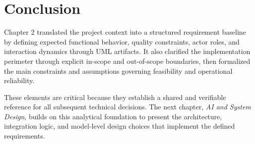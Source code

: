\section{Conclusion}
Chapter 2 translated the project context into a structured requirement baseline by defining expected functional behavior, quality constraints, actor roles, and interaction dynamics through UML artifacts. It also clarified the implementation perimeter through explicit in-scope and out-of-scope boundaries, then formalized the main constraints and assumptions governing feasibility and operational reliability.

These elements are critical because they establish a shared and verifiable reference for all subsequent technical decisions. The next chapter, \textit{AI and System Design}, builds on this analytical foundation to present the architecture, integration logic, and model-level design choices that implement the defined requirements.
